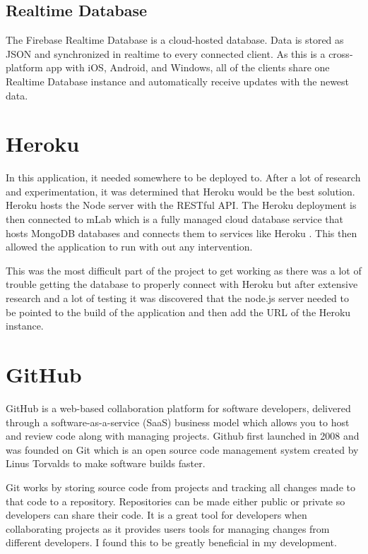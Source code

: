 \subsection{Realtime Database}
The Firebase Realtime Database is a cloud-hosted database. Data is stored as JSON and synchronized in realtime to every connected client. As this is a cross-platform app with iOS, Android, and Windows, all of the clients share one Realtime Database instance and automatically receive updates with the newest data.\cite{realtime}

\section{Heroku}
In this application, it needed somewhere to be deployed to. After a lot of research and experimentation, it was determined that Heroku\cite{heroku} would be the best solution. Heroku hosts the Node server with the RESTful API. The Heroku deployment is then connected to mLab which is a fully managed cloud database service that hosts MongoDB databases and connects them to services like Heroku \cite{mlab}. This then allowed the application to run with out any intervention. 

This was the most difficult part of the project to get working as there was a lot of trouble getting the database to properly connect with Heroku but after extensive research and a lot of testing it was discovered that the node.js server needed to be pointed to the build of the application and then add the URL of the Heroku instance.

\section{GitHub}
GitHub is a web-based collaboration platform for software developers, delivered through a software-as-a-service (SaaS) business model which allows you to host and review code along with managing projects. Github first launched in 2008 and was founded on Git which is an open source code management system created by Linus Torvalds to make software builds faster.\cite{github}

Git works by storing source code from projects and tracking all changes made to that code to a repository. Repositories can be made either public or private so developers can share their code. It is a great tool for developers when collaborating projects as it provides users tools for managing changes from different developers. I found this to be greatly beneficial in my development.

